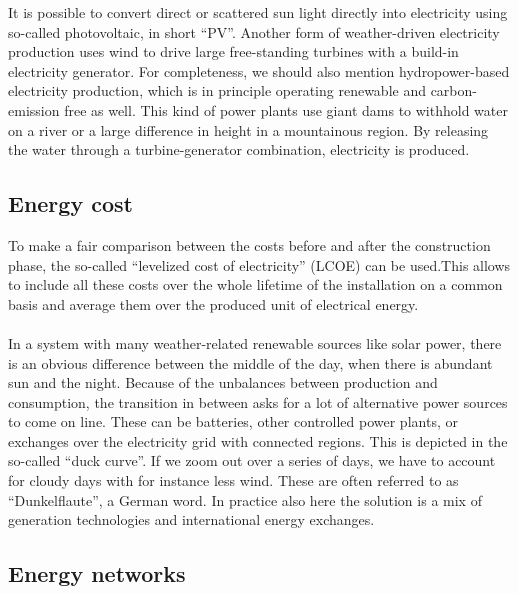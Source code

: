 \documentclass[../summary.tex]{subfiles}
\begin{document}
	It is possible to convert direct or scattered sun light directly into electricity using so-called photovoltaic, in short “PV”. Another form of weather-driven electricity production uses wind to drive large free-standing turbines with a build-in electricity generator. For completeness, we should also mention hydropower-based electricity production, which is in principle operating renewable and carbon-emission free as well. This kind of power plants use giant dams to withhold water on a river or a large difference in height in a mountainous region. By releasing the water through a turbine-generator combination, electricity is produced.
	
	\subsection{Energy cost}
	
	To make a fair comparison between the costs before and after the construction phase, the so-called “levelized cost of electricity” (LCOE) can be used.This allows to include all these costs over the whole lifetime of the installation on a common basis and average them over the produced unit of electrical energy. 
	\\\\
	In a system with many weather-related renewable sources like solar power, there is an obvious difference between the middle of the day, when there is abundant sun and the night. Because of the unbalances between production and consumption, the transition in between asks for a lot of alternative power sources to come on line. These can be batteries, other controlled power plants, or exchanges over the electricity grid with connected regions. This is depicted in the so-called “duck curve”. If we zoom out over a series of days, we have to account for cloudy days with for instance less wind. These are often referred to as “Dunkelflaute”, a German word. In practice also here the solution is a mix of generation technologies and international energy exchanges.
	
	\subsection{Energy networks}
	
\end{document}
